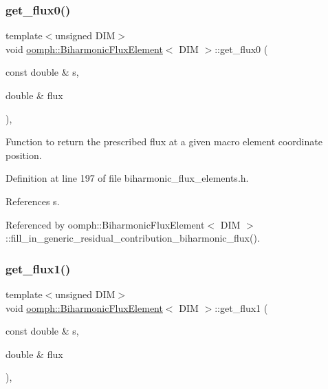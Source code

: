\subsubsection{\texorpdfstring{get\+\_\+flux0()}{get\_flux0()}}
{\footnotesize\ttfamily template$<$unsigned D\+IM$>$ \\
void \hyperlink{classoomph_1_1BiharmonicFluxElement}{oomph\+::\+Biharmonic\+Flux\+Element}$<$ D\+IM $>$\+::get\+\_\+flux0 (\begin{DoxyParamCaption}\item[{const double \&}]{s,  }\item[{double \&}]{flux }\end{DoxyParamCaption})\hspace{0.3cm}{\ttfamily [inline]}, {\ttfamily [private]}}



Function to return the prescribed flux at a given macro element coordinate position. 



Definition at line 197 of file biharmonic\+\_\+flux\+\_\+elements.\+h.



References s.



Referenced by oomph\+::\+Biharmonic\+Flux\+Element$<$ D\+I\+M $>$\+::fill\+\_\+in\+\_\+generic\+\_\+residual\+\_\+contribution\+\_\+biharmonic\+\_\+flux().

\mbox{\label{classoomph_1_1BiharmonicFluxElement_ab963c3e9529215e2dc1b2b0850aab96c}} 
\subsubsection{\texorpdfstring{get\+\_\+flux1()}{get\_flux1()}}
{\footnotesize\ttfamily template$<$unsigned D\+IM$>$ \\
void \hyperlink{classoomph_1_1BiharmonicFluxElement}{oomph\+::\+Biharmonic\+Flux\+Element}$<$ D\+IM $>$\+::get\+\_\+flux1 (\begin{DoxyParamCaption}\item[{const double \&}]{s,  }\item[{double \&}]{flux }\end{DoxyParamCaption})\hspace{0.3cm}{\ttfamily [inline]}, {\ttfamily [private]}}



